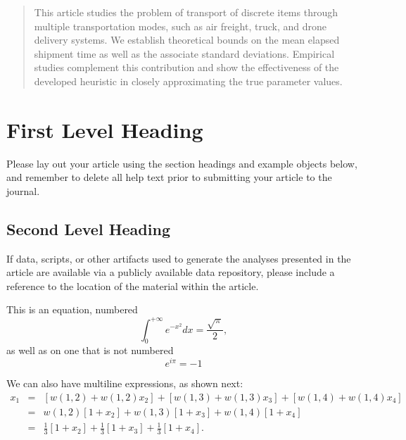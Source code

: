 \maketitle

\begin{abstract}
      This article studies the problem of transport of discrete items through multiple transportation modes, such as air freight, truck, and drone delivery systems. We establish theoretical bounds on the mean elapsed shipment time as well as the associate standard deviations. Empirical studies complement this contribution and show the effectiveness of the developed heuristic in closely approximating the true parameter values.

\end{abstract}

\section{First Level Heading}
Please lay out your article using the section headings and example objects below, and remember to delete all help text prior to submitting your article to the journal.



\subsection{Second Level Heading}
If data, scripts, or other artifacts used to generate the analyses presented in the article are available via a publicly available data repository, please include a reference to the location of the material within the article.

This is an equation, numbered
\begin{equation}
      \int_0^{+\infty}e^{-x^2}dx=\frac{\sqrt{\pi}}{2},
\end{equation}
as well as on one that is not numbered
\begin{equation*}
      e^{i\pi}=-1
\end{equation*}

We can also have multiline expressions, as shown next:
\begin{eqnarray*}
      x_1&= & [w(1,2) + w(1,2) x_2] + [w(1,3) + w(1,3) x_3] + [w(1,4) + w(1,4) x_4] \\
      &= & w(1,2) [1+ x_2] + w(1,3)[1 + x_3] + w(1,4)[1  +  x_4] \\
      &= & \tfrac{1}{3} [1+ x_2] + \tfrac{1}{3}[1 + x_3] + \tfrac{1}{3}[1  +  x_4] .
\end{eqnarray*}


